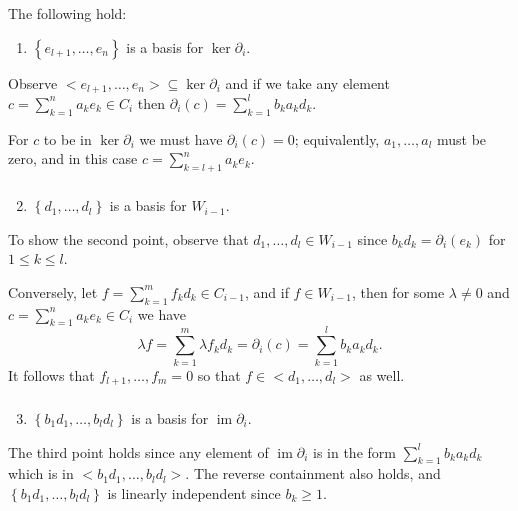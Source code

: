 \documentclass{beamer}
\newcommand{\cbr}[1]{\left\{#1\right\}}
\DeclareMathOperator{\im}{im}
\begin{document}
\begin{frame}
  \frametitle{}

  The following hold: \begin{enumerate}
    \item $\cbr{e_{l+1},\dots,e_n}$ is a basis for $\ker\partial_i$.
  \end{enumerate}

  Observe $<e_{l+1},\dots,e_n>\subseteq \ker\partial_i$ and if we take any element $c = \sum_{k=1}^n a_ke_k\in C_i$ then $\partial_i( c) = \sum_{k=1}^lb_ka_kd_k$. 
  
  For $c$ to be in $\ker\partial_i$ we must have $\partial_i(c) = 0$; equivalently, $a_1,\dots,a_l$ must be zero, and in this case $c = \sum_{k=l+1}^n a_ke_k$.

\end{frame}

\begin{frame}
  \frametitle{}
  
  \begin{enumerate}
    \setcounter{enumi}{1}
    \item $\cbr{d_1,\dots,d_l}$ is a basis for $W_{i-1}$. 
  \end{enumerate}
  To show the second point, observe that $d_1,\dots,d_l\in W_{i-1}$ since $b_kd_k = \partial_i(e_k)$ for $1\leq k \leq l$. 

  Conversely, let $f = \sum_{k=1}^m f_kd_k\in C_{i-1}$, and if $f\in W_{i-1}$, then for some $\lambda\neq 0$ and $c =\sum_{k=1}^n a_ke_k\in C_i$ we have \[\lambda f = \sum_{k=1}^m \lambda f_kd_k = \partial_i(c) = \sum_{k=1}^lb_ka_kd_k.\] It follows that $f_{l+1},\dots,f_m = 0$ so that $f\in <d_1,\dots,d_l>$ as well.

\end{frame}

\begin{frame}
  \frametitle{}

  \begin{enumerate}
    \setcounter{enumi}{2}
    \item $\cbr{b_1d_1,\dots,b_ld_l}$ is a basis for $\im\partial_i$.
  \end{enumerate}
  The third point holds since any element of $\im\partial_i$ is in the form $\sum_{k=1}^lb_ka_kd_k$ which is in $<b_1d_1,\dots,b_ld_l>$. The reverse containment also holds, and $\cbr{b_1d_1,\dots,b_ld_l}$ is linearly independent since $b_k\geq 1 $.

\end{frame}
\end{document}
